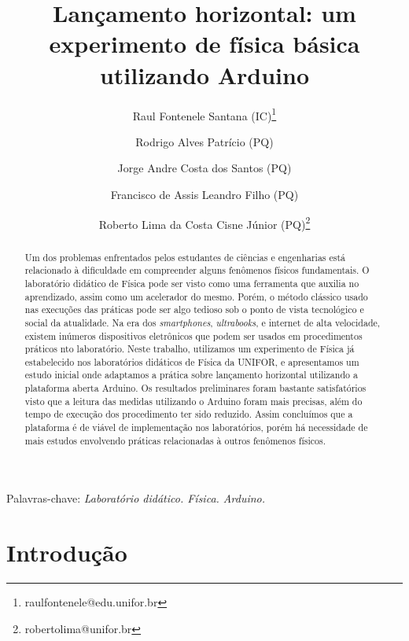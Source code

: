 \documentclass[11pt,a4paper]{article}
\title{Lançamento horizontal: um experimento de física básica utilizando Arduino}
\author[1]{Raul Fontenele Santana (IC)\thanks{raulfontenele@edu.unifor.br}}
\author[1]{Rodrigo Alves Patrício (PQ)}
\author[1]{Jorge Andre Costa dos Santos (PQ)}
\author[2]{Francisco de Assis Leandro Filho (PQ)}
\author[1]{Roberto Lima da Costa Cisne Júnior (PQ)\thanks{robertolima@unifor.br}}
\affil[1]{Universidade de Fortaleza {-} UNIFOR}
\affil[2]{Instituto Federal de Educação, Ciência e Tecnologia do Ceará {-} IFCE}
\newcommand{\keywords}[1]{\noindent Palavras-chave: \textit{#1}}
\begin{document}
\maketitle



\keywords{Laboratório didático. Física. Arduino.}



\begin{abstract}

\noindent
Um dos problemas enfrentados pelos estudantes de ciências e engenharias está relacionado à dificuldade em compreender alguns fenômenos físicos fundamentais.
O laboratório didático de Física pode ser visto como uma ferramenta que auxilia no aprendizado, assim como um acelerador do mesmo.
Porém, o método clássico usado nas execuções das práticas pode ser algo tedioso sob o ponto de vista tecnológico e social da atualidade.
Na era dos \emph{smartphones}, \emph{ultrabooks}, e internet de alta velocidade, existem inúmeros dispositivos eletrônicos que podem ser usados em procedimentos práticos nto laboratório.
Neste trabalho, utilizamos um experimento de Física já estabelecido nos laboratórios didáticos de Física da UNIFOR, e apresentamos um estudo inicial onde adaptamos a prática sobre lançamento horizontal utilizando a plataforma aberta Arduino.
Os resultados preliminares foram bastante satisfatórios visto que a leitura das medidas utilizando o Arduino foram mais precisas, além do tempo de execução dos procedimento ter sido reduzido. Assim concluímos que a plataforma é de viável de implementação nos laboratórios, porém há necessidade de mais estudos envolvendo práticas relacionadas à outros fenômenos físicos.

\end{abstract}



\section{Introdução}
\end{document}
